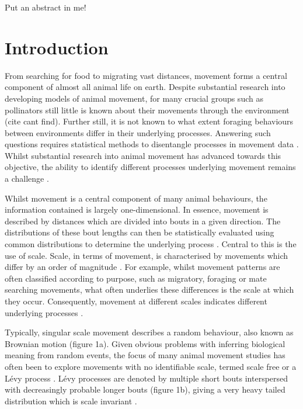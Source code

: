 \documentclass[11pt,usenames,dvipsnames,a4paper]{article}
\begin{document}
\begin{linenumbers}
Put an abstract in me!
\end{linenumbers}

\section{Introduction}

\begin{linenumbers}
\hspace{\parindent}
From searching for food to migrating vast distances, movement forms a central component of almost all animal life on earth. Despite substantial research into developing models of animal movement, for many crucial groups such as pollinators still little is known about their movements through the environment (cite cant find). Further still, it is not known to what extent foraging behaviours between environments differ in their underlying processes. Answering such questions requires statistical methods to disentangle processes in movement data \citep{Nathan2008}. Whilst substantial research into animal movement has advanced towards this objective, the ability to identify different processes underlying movement remains a challenge \citep{Patterson2017}. 

Whilst movement is a central component of many animal behaviours, the information contained is largely one-dimensional. In essence, movement is described by distances which are divided into bouts in a given direction. The distributions of these bout lengths can then be statistically evaluated using common distributions to determine the underlying process \citep{Murphy2007, Reynolds2018}. Central to this is the use of scale. Scale, in terms of movement, is characterised by movements which differ by an order of magnitude \citep{Levin1992}. For example, whilst movement patterns are often classified according to purpose, such as migratory, foraging or mate searching movements, what often underlies these differences is the scale at which they occur. Consequently, movement at different scales indicates different underlying processes \citep{Nathan2008}. 

Typically, singular scale movement describes a random behaviour, also known as Brownian motion \citep{Barthelemy2008} (figure 1a). Given obvious problems with inferring biological meaning from random events, the focus of many animal movement studies \citep{Harris2012, Ariel2015, Humphries2010, Baronchelli2013, Boyer, Ayala-Orozco2004, Sims2008, Viswanathan1999} has often been to explore movements with no identifiable scale, termed scale free or a L\'evy process \citep{Viswanathan1999}. L\'evy processes are denoted by multiple short bouts interspersed with decreasingly probable longer bouts \citep{Barthelemy2008} (figure 1b), giving a very heavy tailed distribution which is scale invariant \citep{Reynolds2018}.


\end{linenumbers}
\end{document}
